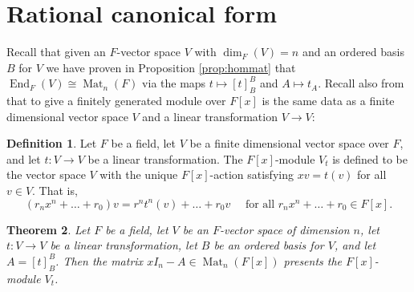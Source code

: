 \documentclass[12pt]{report}
\newtheorem{theorem}{Theorem}[chapter]
\numberwithin{equation}{section}
\numberwithin{theorem}{chapter}
\theoremstyle{definition}
\newtheorem{definition}[theorem]{Definition}
\newtheorem*{basic properties}{Basic Properties}
\newtheorem*{Important Remark}{Important Remark}
\DeclareMathOperator{\End}{End}
\DeclareMathOperator{\M}{Mat}
\begin{document}
\section{Rational canonical form}

 Recall that given an $F$-vector space $V$ with $\dim_F(V)=n$ and an ordered basis $B$ for $V$ we have proven in Proposition \ref{prop:hommat} that $\End_F(V)\cong \M_n(F)$ via the maps $t\mapsto [t]_B^B$ and $A\mapsto t_A$.
Recall also from  that to give a finitely generated module over $F[x]$ is the same data as a finite dimensional vector space $V$ and a linear transformation $V \to V$:
 
\begin{definition} 
Let $F$ be a field, let $V$ be a finite dimensional vector space over $F$, and let $t: V \to V$ be a linear transformation. The $F[x]$-module $V_t$ is defined to be the vector space $V$ with the unique $F[x]$-action satisfying $xv = t(v)$ for all $v \in V$. That is, 
$$(r_nx^n + \dots+ r_0)v = r^nt^n(v) + \dots + r_0v \quad \text{ for all } r_nx^n + \dots + r_0 \in F[x].$$
\end{definition}
 
\begin{theorem}\label{presents F[x] module}
Let $F$ be a field, let $V$ be an $F$-vector space of dimension $n$, let $t\!: V \to V$ be a linear transformation, let $B$ be an ordered basis for $V$, and let $A = [t]_B^B$. Then the matrix $xI_n - A \in \M_n(F[x])$ presents the $F[x]$-module $V_t$.
\end{theorem}
\end{document}
